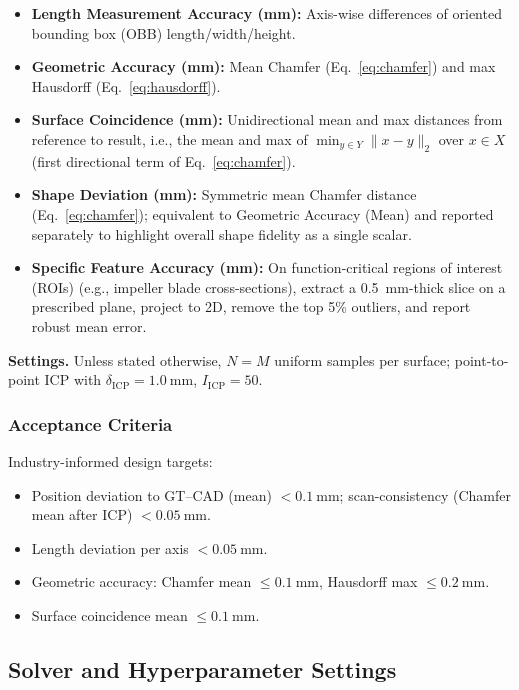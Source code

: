 \documentclass{ieeeaccess}
\begin{document}
\begin{itemize}
  \item \textbf{Length Measurement Accuracy (mm):} Axis-wise differences of oriented bounding box (OBB) length/width/height.
  \item \textbf{Geometric Accuracy (mm):} Mean Chamfer (Eq.~\eqref{eq:chamfer}) and max Hausdorff (Eq.~\eqref{eq:hausdorff}).
  \item \textbf{Surface Coincidence (mm):} Unidirectional mean and max distances from reference to result, i.e., the mean and max of $\min_{y\in Y}\|x-y\|_2$ over $x\in X$ (first directional term of Eq.~\eqref{eq:chamfer}).
  \item \textbf{Shape Deviation (mm):} Symmetric mean Chamfer distance (Eq.~\eqref{eq:chamfer}); equivalent to Geometric Accuracy (Mean) and reported separately to highlight overall shape fidelity as a single scalar.
  \item \textbf{Specific Feature Accuracy (mm):} On function-critical regions of interest (ROIs) (e.g., impeller blade cross-sections), extract a \SI{0.5}{\milli\meter}-thick slice on a prescribed plane, project to 2D, remove the top 5\% outliers, and report robust mean error.
\end{itemize}
\textbf{Settings.} Unless stated otherwise, \(N=M\) uniform samples per surface; point-to-point ICP with \(\delta_{\mathrm{ICP}}=\SI{1.0}{\milli\meter}\), \(I_{\mathrm{ICP}}=50\).



\subsubsection{Acceptance Criteria}\label{sec:accept}
Industry-informed design targets:
\begin{itemize}
  \item Position deviation to GT--CAD (mean) $<\SI{0.1}{\milli\meter}$;
        scan-consistency (Chamfer mean after ICP) $<\SI{0.05}{\milli\meter}$.
  \item Length deviation per axis $<\SI{0.05}{\milli\meter}$.
  \item Geometric accuracy: Chamfer mean $\le\SI{0.1}{\milli\meter}$, Hausdorff max $\le\SI{0.2}{\milli\meter}$.
  \item Surface coincidence mean $\le\SI{0.1}{\milli\meter}$.
\end{itemize}


\subsection{Solver and Hyperparameter Settings}
\label{sec:hyperparams}
\end{document}
